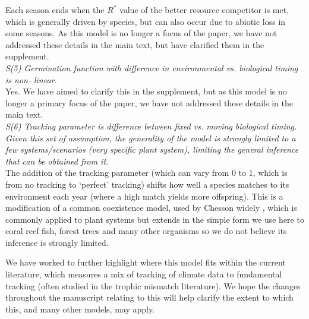 \documentclass[11pt]{article}
\begin{document}
Each season ends when the $R^*$ value of the better resource competitor is met, which is generally driven by species, but can also occur due to abiotic loss in some seasons. As this model is no longer a focus of the paper, we have not addressed these details in the main text, but have clarified them in the supplement.\\

\emph{S(5)     Germination function with difference in environmental vs. biological timing is non-
linear.}\\

Yes. We have aimed to clarify this in the supplement, but as this model is no longer a primary focus of the paper, we have not addressed these details in the main text.\\

\emph{S(6)     Tracking parameter is difference between fixed vs. moving biological timing.
Given this set of assumption, the generality of the model is strongly limited to a few
systems/scenarios (very specific plant system), limiting the general inference that can be
obtained from it.}\\

The addition of the tracking parameter (which can vary from 0 to 1, which is from no tracking to `perfect' tracking) shifts how well a species matches to its environment each year (where a high match yields more offspring). This is a modification of a common coexistence model, used by Chesson widely \citep[][]{Chesson:2000vd,Chesson:2004eo}, which is commonly applied to plant systems but extends in the simple form we use here to coral reef fish, forest trees and many other organisms \citep[see][]{Chesson:1997dz} so we do not believe its inference is strongly limited.

We have worked to further highlight where this model fits within the current literature, which measures a mix of tracking of climate data to fundamental tracking (often studied in the trophic mismatch literature). We hope the changes throughout the manuscript relating to this will help clarify the extent to which this, and many other models, may apply.\\
\end{document}
